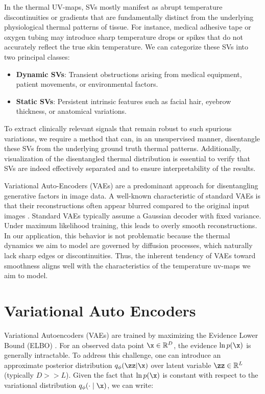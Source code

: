 In the thermal UV-maps, SVs mostly manifest as abrupt temperature discontinuities or gradients that are fundamentally distinct from the underlying physiological thermal patterns of tissue. For instance, medical adhesive tape or oxygen tubing may introduce sharp temperature drops or spikes that do not accurately reflect the true skin temperature. We can categorize these SVs into two principal classes:

\begin{itemize}
  \item \textbf{Dynamic SVs}: Transient obstructions arising from medical equipment, patient movements, or environmental factors.
  \item \textbf{Static SVs}: Persistent intrinsic features such as facial hair, eyebrow thickness, or anatomical variations.
\end{itemize}

To extract clinically relevant signals that remain robust to such spurious variations, we require a method that can, in an unsupervised manner, disentangle these SVs from the underlying ground truth thermal patterns.
Additionally, visualization of the disentangled thermal distribution is essential to verify that SVs are indeed effectively separated and to ensure interpretability of the results.

Variational Auto-Encoders (VAEs) \citep{kingma2013auto} are a predominant approach for disentangling generative factors in image data.
A well-known characteristic of standard VAEs is that their reconstructions often appear blurred compared to the original input images \citep{kingma2019introduction}.
Standard VAEs typically assume a Gaussian decoder with fixed variance.
Under maximum likelihood training, this leads to overly smooth reconstructions.
In our application, this behavior is not problematic because the thermal dynamics we aim to model are governed by diffusion processes, which naturally lack sharp edges or discontinuities.
Thus, the inherent tendency of VAEs toward smoothness aligns well with the  characteristics of the temperature uv-maps we aim to model.

\section{Variational Auto Encoders}

Variational Autoencoders (VAEs) are trained by maximizing the Evidence Lower Bound (ELBO) \citep{kingma2019introduction}.
For an observed data point $\x \in \mathbb{R}^D$, the evidence $\ln p(\x)$ is generally intractable. To address this challenge, one can introduce an approximate posterior distribution $q_{\phi}(\zz|\x)$ over latent variable $\zz \in \mathbb{R}^L$ (typically $D >> L$). Given the fact that $\ln p(\x)$ is constant with respect to the variational distribution $q_{\phi}(\cdot \mid \x)$, we can write:

